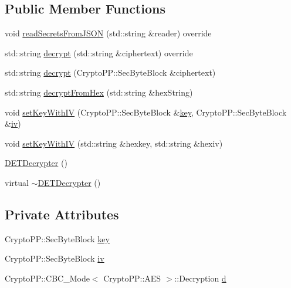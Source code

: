 \subsection*{Public Member Functions}
\begin{DoxyCompactItemize}
\item 
void \hyperlink{classDETDecrypter_a8e32703400ead9c35a80549b011307d7}{read\+Secrets\+From\+J\+S\+ON} (std\+::string \&reader) override
\item 
std\+::string \hyperlink{classDETDecrypter_ac317ce154d64eb1fce4450c2b03a12d9}{decrypt} (std\+::string \&ciphertext) override
\item 
std\+::string \hyperlink{classDETDecrypter_a1a0f8ebde80190b4d28ed071d139fc3a}{decrypt} (Crypto\+P\+P\+::\+Sec\+Byte\+Block \&ciphertext)
\item 
std\+::string \hyperlink{classDETDecrypter_acb1551670a0c4161a362f20c0eed0b3a}{decrypt\+From\+Hex} (std\+::string \&hex\+String)
\item 
void \hyperlink{classDETDecrypter_aef2cdd9235fb7d927ab4992fec6efe78}{set\+Key\+With\+IV} (Crypto\+P\+P\+::\+Sec\+Byte\+Block \&\hyperlink{classDETDecrypter_a44a998e051bc9efc04295b9401ec716e}{key}, Crypto\+P\+P\+::\+Sec\+Byte\+Block \&\hyperlink{classDETDecrypter_a601eb88318e103fd40ad1864f951ab54}{iv})
\item 
void \hyperlink{classDETDecrypter_aea297de1f5c514a5156eabc22c556b3b}{set\+Key\+With\+IV} (std\+::string \&hexkey, std\+::string \&hexiv)
\item 
\hyperlink{classDETDecrypter_af2981aa97e655d370fc77670740b16f2}{D\+E\+T\+Decrypter} ()
\item 
virtual \hyperlink{classDETDecrypter_a2d049175d238e1e657515be9048b6ab3}{$\sim$\+D\+E\+T\+Decrypter} ()
\end{DoxyCompactItemize}
\subsection*{Private Attributes}
\begin{DoxyCompactItemize}
\item 
Crypto\+P\+P\+::\+Sec\+Byte\+Block \hyperlink{classDETDecrypter_a44a998e051bc9efc04295b9401ec716e}{key}
\item 
Crypto\+P\+P\+::\+Sec\+Byte\+Block \hyperlink{classDETDecrypter_a601eb88318e103fd40ad1864f951ab54}{iv}
\item 
Crypto\+P\+P\+::\+C\+B\+C\+\_\+\+Mode$<$ Crypto\+P\+P\+::\+A\+ES $>$\+::Decryption \hyperlink{classDETDecrypter_ab598e2e972f3052d372f37d39aae07cf}{d}
\end{DoxyCompactItemize}


